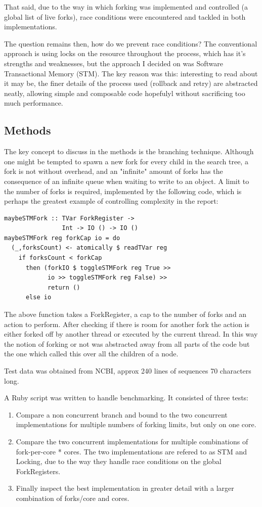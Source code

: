 \documentclass{bioinfo}
\begin{document}
That said, due to the way in which forking was implemented and controlled (a global list of live forks), race conditions were encountered and tackled in both implementations.

The question remains then, how do we prevent race conditions? The conventional approach is using locks on the resource throughout the process, which has it's strengths and weaknesses, but the approach I decided on was Software Transactional Memory (STM\cite{compmemtran}). The key reason was this: interesting to read about it may be, the finer details of the process used (rollback and retry) are abstracted neatly, allowing simple and composable code hopefulyl without sacrificing too much performance.


\begin{methods}
\section{Methods}

The key concept to discuss in the methods is the branching technique. Although one might be tempted to spawn a new fork for every child in the search tree, a fork is not without overhead, and an "infinite" amount of forks has the consequence of an infinite queue when waiting to write to an object. A limit to the number of forks is required, implemented by the following code, which is perhaps the greatest example of controlling complexity in the report:
\begin{verbatim}
maybeSTMFork :: TVar ForkRegister ->
                Int -> IO () -> IO ()
maybeSTMFork reg forkCap io = do
  (_,forksCount) <- atomically $ readTVar reg
    if forksCount < forkCap
      then (forkIO $ toggleSTMFork reg True >> 
            io >> toggleSTMFork reg False) >>
            return ()
      else io
\end{verbatim}
The above function takes a ForkRegister, a cap to the number of forks and an action to perform. After checking if there is room for another fork the action is either forked off by another thread or executed by the current thread. In this way the notion of forking or not was abstracted away from all parts of the code but the one which called this over all the children of a node.

Test data was obtained from NCBI, approx 240 lines of sequences 70 characters long.

A Ruby script was written to handle benchmarking. It consisted of three tests:
\begin{enumerate}
	\item Compare a non concurrent branch and bound to the two concurrent implementations for multiple numbers of forking limits, but only on one core.
	\item Compare the two concurrent implementations for multiple combinations of fork-per-core * cores. The two implementations are refered to as STM and Locking, due to the way they handle race conditions on the global ForkRegisters.
	\item Finally inspect the best implementation in greater detail with a larger combination of forks/core and cores.
\end{enumerate}


\end{methods}
\end{document}
